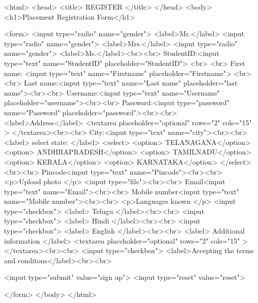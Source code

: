<html>
<head> <title> REGISTER </title>
</head>
<body>
<h1>Placement Registration Form</h1>


<form>
<input type="radio" name="gender">
<label>Mr.</label>
<input type="radio" name="gender">
<label>Mrs.</label>
<input type="radio" name="gender">
<label>Ms.</label><br><br>
StudentID:<input type="text" name="StudentID" placeholder="StudentID"> <br> <br>
First name: <input type="text" name="Firstname" placeholder="Firstname"> <br> <br>
Last name:<input type="text" name="Last name" placeholder="last name"><br><br>
Username:<input type="text" name="Username" placeholder="username"><br><br>
Password:<input type="password" name="Password" placeholder="password"><br><br>
<label>Address</label>
<textarea placeholder="optional" rows="2" cols="15" > </textarea><br><br>
City:<input type="text" name="city"><br><br>
<label> select state:  </label>
<select> 
<option> TELANAGANA</option>
<option> ANDHRAPRADESH</option>
<option> TAMILNADU</option>
<option> KERALA</option>
<option> KARNATAKA</option>
</select><br><br>
Pincode<input type="text" name="Pincode"><br><br>
<p>Upload photo </p>
<input type="file"><br><br>
Email<input type="text" name="Email"><br><br>
Mobile number<input type="text" name="Mobile number"><br><br>
<p>Languages known </p>
<input type="checkbox">
<label> Telugu </label><br><br>
<input type="checkbox">
<label> Hindi </label><br><br>
<input type="checkbox">
<label> English </label><br><br>
<label> Additional information </label>
<textarea placeholder="optional" rows="2" cols="15" > </textarea><br><br>
<input type="checkbox">
<label>Accepting the terms and conditons</label><br><br>




<input type="submit" value="sign up">
<input type="reset" value="reset">


</form>
</body>
</html>
